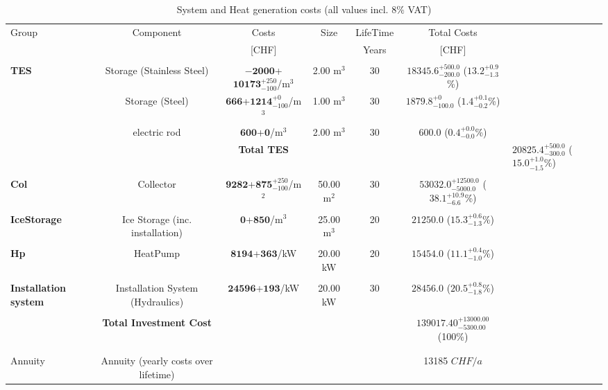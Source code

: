 \documentclass[english]{SPFShortReport}
\begin{document}
\begin{table}[!ht]
\centering
\caption{System and Heat generation costs (all values incl. 8$\%$ VAT) }
\begin{adjustbox}{max width =\textwidth}
\begin{tabular}{l | c c c c c } 
\hline
\hline
Group &Component &Costs &Size &LifeTime &Total Costs \\ 
 & &[CHF] & &Years &[CHF]\\ 
\hline
\\
\textbf{TES} & Storage (Stainless Steel) & $\mathbf{-2000}$+$\mathbf{10173}^{+250}_{-100}$/m$^3$ & 2.00 m$^3$ & 30 & $\mathbf{18345.6}^{+500.0}_{-200.0}$ ($\mathbf{13.2}^{+0.9}_{-1.3}$\%) \\
 & Storage (Steel) & $\mathbf{666}$+$\mathbf{1214}^{+0}_{-100}$/m$^3$ & 1.00 m$^3$ & 30 & $\mathbf{1879.8}^{+0}_{-100.0}$ ($\mathbf{1.4}^{+0.1}_{-0.2}$\%) \\
 & electric rod & $\mathbf{600}$+$\mathbf{0}$/m$^3$ & 2.00 m$^3$ & 30 & $\mathbf{600.0}$ ($\mathbf{0.4}^{+0.0}_{-0.0}$\%) \\
&
 & \textbf{Total TES} & & & & $\mathbf{20825.4}^{+500.0}_{-300.0}$ ($\mathbf{15.0}^{+1.0}_{-1.5}$\%) \\
\hline \\
\textbf{Col} & Collector & $\mathbf{9282}$+$\mathbf{875}^{+250}_{-100}$/m$^2$ & 50.00 m$^2$ & 30 & $\mathbf{53032.0}^{+12500.0}_{-5000.0}$ ($\mathbf{38.1}^{+10.9}_{-6.6}$\%) \\
\hline \\
\textbf{IceStorage} & Ice Storage (inc. installation) & $\mathbf{0}$+$\mathbf{850}$/m$^3$ & 25.00 m$^3$ & 20 & $\mathbf{21250.0}$ ($\mathbf{15.3}^{+0.6}_{-1.3}$\%) \\
\hline \\
\textbf{Hp} & HeatPump & $\mathbf{8194}$+$\mathbf{363}$/kW & 20.00 kW & 20 & $\mathbf{15454.0}$ ($\mathbf{11.1}^{+0.4}_{-1.0}$\%) \\
\hline \\
\textbf{Installation system} & Installation System (Hydraulics) & $\mathbf{24596}$+$\mathbf{193}$/kW & 20.00 kW & 30 & $\mathbf{28456.0}$ ($\mathbf{20.5}^{+0.8}_{-1.8}$\%) \\
\hline \\
 & \textbf{Total Investment Cost} & & & & \textbf{$\mathbf{139017.40}^{+13000.00}_{-5300.00}$} (100\%) \\ 
\hline \\ 
\hline \\ 
Annuity & Annuity (yearly costs over lifetime)  &&& & 13185 $CHF/a$  \\

\end{tabular}
\end{adjustbox}
\end{table}
\end{document}
